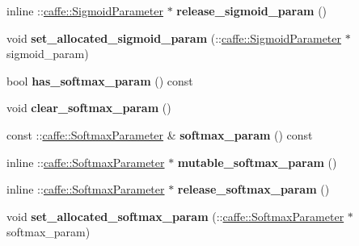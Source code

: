 \begin{DoxyCompactItemize}
inline \+::\mbox{\hyperlink{classcaffe_1_1_sigmoid_parameter}{caffe\+::\+Sigmoid\+Parameter}} $\ast$ {\bfseries release\+\_\+sigmoid\+\_\+param} ()
\item 
\mbox{\label{classcaffe_1_1_layer_parameter_a6e7832faf65dbe6c79184fecae7017af}} 
void {\bfseries set\+\_\+allocated\+\_\+sigmoid\+\_\+param} (\+::\mbox{\hyperlink{classcaffe_1_1_sigmoid_parameter}{caffe\+::\+Sigmoid\+Parameter}} $\ast$sigmoid\+\_\+param)
\item 
\mbox{\label{classcaffe_1_1_layer_parameter_add934108dfad2800a1497a744b402b25}} 
bool {\bfseries has\+\_\+softmax\+\_\+param} () const
\item 
\mbox{\label{classcaffe_1_1_layer_parameter_a89f8bccc3794b5ff43f16aa976a2d942}} 
void {\bfseries clear\+\_\+softmax\+\_\+param} ()
\item 
\mbox{\label{classcaffe_1_1_layer_parameter_a6c5f5f8a1d0babdac82be62194556cd9}} 
const \+::\mbox{\hyperlink{classcaffe_1_1_softmax_parameter}{caffe\+::\+Softmax\+Parameter}} \& {\bfseries softmax\+\_\+param} () const
\item 
\mbox{\label{classcaffe_1_1_layer_parameter_a469d32bfd5626c234a7a03f19bd38d73}} 
inline \+::\mbox{\hyperlink{classcaffe_1_1_softmax_parameter}{caffe\+::\+Softmax\+Parameter}} $\ast$ {\bfseries mutable\+\_\+softmax\+\_\+param} ()
\item 
\mbox{\label{classcaffe_1_1_layer_parameter_ab06c6f8d30770f59960eee588e0db005}} 
inline \+::\mbox{\hyperlink{classcaffe_1_1_softmax_parameter}{caffe\+::\+Softmax\+Parameter}} $\ast$ {\bfseries release\+\_\+softmax\+\_\+param} ()
\item 
\mbox{\label{classcaffe_1_1_layer_parameter_afaa9b57995c70f36b6870a3384e5787f}} 
void {\bfseries set\+\_\+allocated\+\_\+softmax\+\_\+param} (\+::\mbox{\hyperlink{classcaffe_1_1_softmax_parameter}{caffe\+::\+Softmax\+Parameter}} $\ast$softmax\+\_\+param)
\item 
\mbox{\label{classcaffe_1_1_layer_parameter_a0fe1639dbdb026403a80877701b4475b}} 

\end{DoxyCompactItemize}
